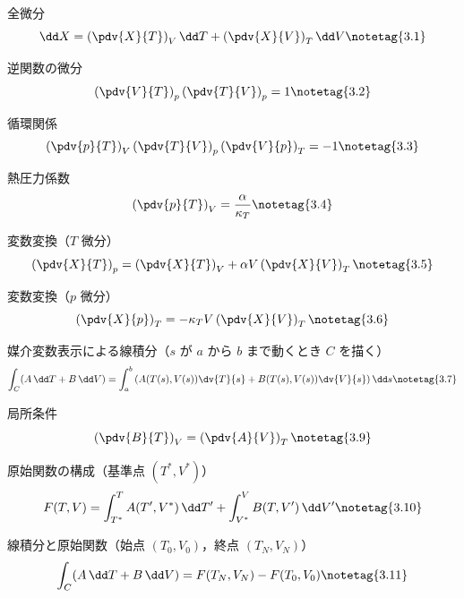 \documentclass[uplatex,dvipdfmx,a4paper,11pt]{jsarticle}
\begin{document}
\youtenseiri
\begin{noteshikilist}
  \item 全微分 %
    \[ \dd X = \left(\pdv{X}{T}\right)_{V}\dd T + \left(\pdv{X}{V}\right)_{T}\dd V \notetag{3.1} \]
  \item 逆関数の微分 %
    \[ \left(\pdv{V}{T}\right)_{p}\left(\pdv{T}{V}\right)_{p} = 1 \notetag{3.2} \]
  \item 循環関係 %
    \[ \left(\pdv{p}{T}\right)_{V}\left(\pdv{T}{V}\right)_{p}\left(\pdv{V}{p}\right)_{T} = -1 \notetag{3.3} \]
  \item 熱圧力係数 %
    \[ \left(\pdv{p}{T}\right)_{V} = \frac{\alpha}{\kappa_{T}} \notetag{3.4} \]
  \item 変数変換（$T$ 微分） %
    \[ \left(\pdv{X}{T}\right)_{p} = \left(\pdv{X}{T}\right)_{V} + \alpha V\left(\pdv{X}{V}\right)_{T} \notetag{3.5} \]
  \item 変数変換（$p$ 微分） %
    \[ \left(\pdv{X}{p}\right)_{T} = -\kappa_{T} V\left(\pdv{X}{V}\right)_{T} \notetag{3.6} \]
  \item 媒介変数表示による線積分（$s$ が $a$ から $b$ まで動くとき $C$ を描く） %
    \[ \int_{C}(A\,\dd T + B\,\dd V) = \int_{a}^{b}\left(A(T(s),V(s))\dv{T}{s} + B(T(s),V(s))\dv{V}{s}\right)\dd s \notetag{3.7} \]
  \item 局所条件 %
    \[ \left(\pdv{B}{T}\right)_{V} = \left(\pdv{A}{V}\right)_{T} \notetag{3.9} \]
  \item 原始関数の構成（基準点 $(T^{*},V^{*})$） %
    \[ F(T,V) = \int_{T^{*}}^{T} A(T',V^{*})\,\dd T' + \int_{V^{*}}^{V} B(T,V')\,\dd V' \notetag{3.10} \]
  \item 線積分と原始関数（始点 $(T_{0},V_{0})$，終点 $(T_{N},V_{N})$） %
    \[ \int_{C}(A\,\dd T + B\,\dd V) = F(T_{N},V_{N}) - F(T_{0},V_{0}) \notetag{3.11} \]
\end{noteshikilist}
\end{document}
